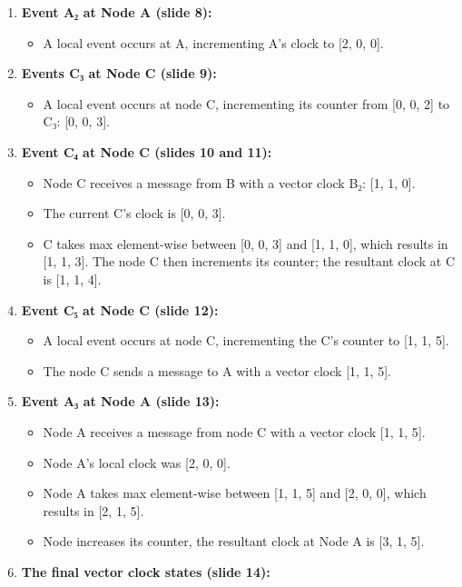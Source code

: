 \begin{enumerate}
\begin{itemize}
\tightlist
\item
A local event occurs at node B, incrementing B's clock from {[}1, 1, 0{]} to {[}1, 2, 0{]}.
\end{itemize}
\item
\textbf{Event A₂ at Node A (slide 8):}

\begin{itemize}
\tightlist
\item
A local event occurs at A, incrementing A's clock to {[}2, 0, 0{]}.
\end{itemize}
\item
\textbf{Events C₃ at Node C (slide 9):}

\begin{itemize}
\tightlist
\item
A local event occurs at node C, incrementing its counter from {[}0, 0, 2{]} to C₃: {[}0, 0, 3{]}.
\end{itemize}
\item
\textbf{Event C₄ at Node C (slides 10 and 11):}

\begin{itemize}
\tightlist
\item
Node C receives a message from B with a vector clock B₂: {[}1, 1, 0{]}.
\item
The current C's clock is {[}0, 0, 3{]}.
\item
C takes max element-wise between {[}0, 0, 3{]} and {[}1, 1, 0{]}, which results in {[}1, 1, 3{]}. The node C then increments its counter; the resultant clock at C is {[}1, 1, 4{]}.
\end{itemize}
\item
\textbf{Event C₅ at Node C (slide 12):}

\begin{itemize}
\tightlist
\item
A local event occurs at node C, incrementing the C's counter to {[}1, 1, 5{]}.
\item
The node C sends a message to A with a vector clock {[}1, 1, 5{]}.
\end{itemize}
\item
\textbf{Event A₃ at Node A (slide 13):}

\begin{itemize}
\tightlist
\item
Node A receives a message from node C with a vector clock {[}1, 1, 5{]}.
\item
Node A's local clock was {[}2, 0, 0{]}.
\item
Node A takes max element-wise between {[}1, 1, 5{]} and {[}2, 0, 0{]}, which results in {[}2, 1, 5{]}.
\item
Node increases its counter, the resultant clock at Node A is {[}3, 1, 5{]}.
\end{itemize}
\item
\textbf{The final vector clock states (slide 14):}


\end{enumerate}
